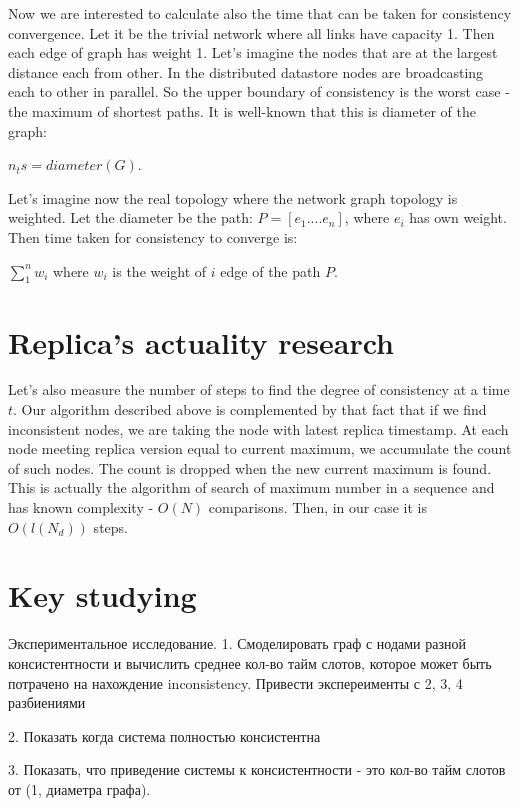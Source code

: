 \documentclass{llncs}
\begin{document}
Now we are interested to calculate also the time that can be taken for consistency convergence.
Let it be the trivial network where all links have capacity 1. Then each edge of graph has weight 1.
Let's imagine the nodes that are at the largest distance each from other. In the distributed datastore nodes are
broadcasting each to other in parallel. So the upper boundary of consistency is the worst case - the maximum of
shortest paths. It is well-known that this is diameter of the graph:

$n_ts = diameter(G)$.

Let's imagine now the real topology where the network graph topology is weighted.
Let the diameter be the path:
$P = [e_1....e_n]$, where $e_i$ has own weight.
Then time taken for consistency to converge is:

$\sum_1^{n}w_i$ where $w_i$ is the weight of $i$ edge of the path $P$.



\section{Replica's actuality research}

Let's also measure the number of steps to find the degree of consistency at a time $t$.
Our algorithm described above is complemented by that fact that if we find inconsistent nodes,
we are taking the node with latest replica timestamp. At each node meeting replica version equal to current maximum, we accumulate the count of such nodes. The count is dropped when the new current maximum is found. This is actually the algorithm of search of maximum number in a sequence and has known complexity - $O(N)$ comparisons.
Then, in our case it is $O(l(N_d))$ steps.



\section{Key studying}\label{sec:experiments}

Экспериментальное исследование.
1. Смоделировать граф с нодами разной консистентности и вычислить среднее кол-во тайм слотов, которое может быть потрачено на нахождение inconsistency.
Привести экспереименты с 2, 3, 4 разбиениями

2. Показать когда система полностью консистентна

3. Показать, что приведение системы к консистентности - это кол-во тайм слотов от (1, диаметра графа).
\end{document}

